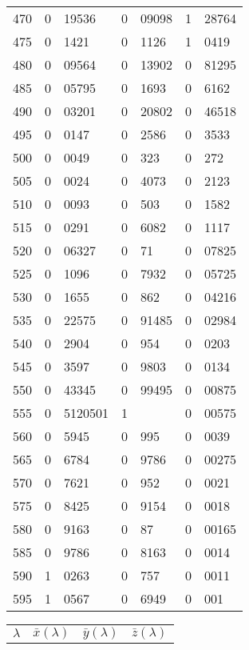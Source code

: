 \begin{table}
{\begin{minipage}[t]{.44\textwidth}
\begin{tabular}{c|r@{.}l | r@{.}l | r@{.}l}
470 & 0&19536   & 0&09098     & 1&28764 \\
475 & 0&1421    & 0&1126      & 1&0419 \\
480 & 0&09564   & 0&13902     & 0&81295 \\
485 & 0&05795   & 0&1693      & 0&6162 \\
490 & 0&03201   & 0&20802     & 0&46518 \\
495 & 0&0147    & 0&2586      & 0&3533 \\
500 & 0&0049    & 0&323       & 0&272 \\
505 & 0&0024    & 0&4073      & 0&2123 \\
510 & 0&0093    & 0&503       & 0&1582 \\
515 & 0&0291    & 0&6082      & 0&1117 \\
520 & 0&06327   & 0&71        & 0&07825 \\
525 & 0&1096    & 0&7932      & 0&05725 \\
530 & 0&1655    & 0&862       & 0&04216 \\
535 & 0&22575   & 0&91485     & 0&02984 \\
540 & 0&2904    & 0&954       & 0&0203 \\
545 & 0&3597    & 0&9803      & 0&0134 \\
550 & 0&43345   & 0&99495     & 0&00875 \\
555 & 0&5120501 & 1&          & 0&00575 \\
560 & 0&5945    & 0&995       & 0&0039 \\
565 & 0&6784    & 0&9786      & 0&00275 \\
570 & 0&7621    & 0&952       & 0&0021 \\
575 & 0&8425    & 0&9154      & 0&0018 \\
580 & 0&9163    & 0&87        & 0&00165 \\
585 & 0&9786    & 0&8163      & 0&0014 \\
590 & 1&0263    & 0&757       & 0&0011 \\
595 & 1&0567    & 0&6949      & 0&001 \\
\end{tabular}
\end{minipage}\hskip2mm
\begin{minipage}[t]{.44\textwidth}
\vspace{0pt}
\begin{tabular}{c|r@{.}l | r@{.}l | r@{.}l}
$\lambda$ & \multicolumn{2}{c|}{$\bar x(\lambda)$} &  \multicolumn{2}{c|}{$\bar
y(\lambda)$} &  \multicolumn{2}{c}{$\bar z(\lambda)$} \\

\end{tabular}
\end{minipage}}
\end{table}
